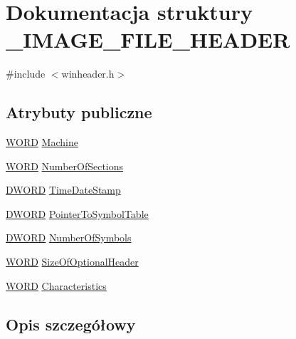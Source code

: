 \hypertarget{struct___i_m_a_g_e___f_i_l_e___h_e_a_d_e_r}{\section{Dokumentacja struktury \-\_\-\-I\-M\-A\-G\-E\-\_\-\-F\-I\-L\-E\-\_\-\-H\-E\-A\-D\-E\-R}
\label{struct___i_m_a_g_e___f_i_l_e___h_e_a_d_e_r}
}


{\ttfamily \#include $<$winheader.\-h$>$}

\subsection*{Atrybuty publiczne}
\begin{DoxyCompactItemize}
\item 
\hyperlink{winheader_8h_ab24077addd3b7b13e086987ff296552c}{W\-O\-R\-D} \hyperlink{struct___i_m_a_g_e___f_i_l_e___h_e_a_d_e_r_aadde4ef78693fa8d4bc1c97c7d3c8c1a}{Machine}
\item 
\hyperlink{winheader_8h_ab24077addd3b7b13e086987ff296552c}{W\-O\-R\-D} \hyperlink{struct___i_m_a_g_e___f_i_l_e___h_e_a_d_e_r_ad604cffb35b69981158822e14e9bc1c0}{Number\-Of\-Sections}
\item 
\hyperlink{winheader_8h_af483253b2143078cede883fc3c111ad2}{D\-W\-O\-R\-D} \hyperlink{struct___i_m_a_g_e___f_i_l_e___h_e_a_d_e_r_af36d3522f4749a93453bde62c0f7732b}{Time\-Date\-Stamp}
\item 
\hyperlink{winheader_8h_af483253b2143078cede883fc3c111ad2}{D\-W\-O\-R\-D} \hyperlink{struct___i_m_a_g_e___f_i_l_e___h_e_a_d_e_r_a5c3f6aef5cd87caa9d5ce887aaf2e522}{Pointer\-To\-Symbol\-Table}
\item 
\hyperlink{winheader_8h_af483253b2143078cede883fc3c111ad2}{D\-W\-O\-R\-D} \hyperlink{struct___i_m_a_g_e___f_i_l_e___h_e_a_d_e_r_a3e054c70bc25a6797608fb32327348ad}{Number\-Of\-Symbols}
\item 
\hyperlink{winheader_8h_ab24077addd3b7b13e086987ff296552c}{W\-O\-R\-D} \hyperlink{struct___i_m_a_g_e___f_i_l_e___h_e_a_d_e_r_a7fc97339de25b2845ef855809be630ff}{Size\-Of\-Optional\-Header}
\item 
\hyperlink{winheader_8h_ab24077addd3b7b13e086987ff296552c}{W\-O\-R\-D} \hyperlink{struct___i_m_a_g_e___f_i_l_e___h_e_a_d_e_r_a121e0ec6d4ce2ea021df48f6949956c3}{Characteristics}
\end{DoxyCompactItemize}


\subsection{Opis szczegółowy}


